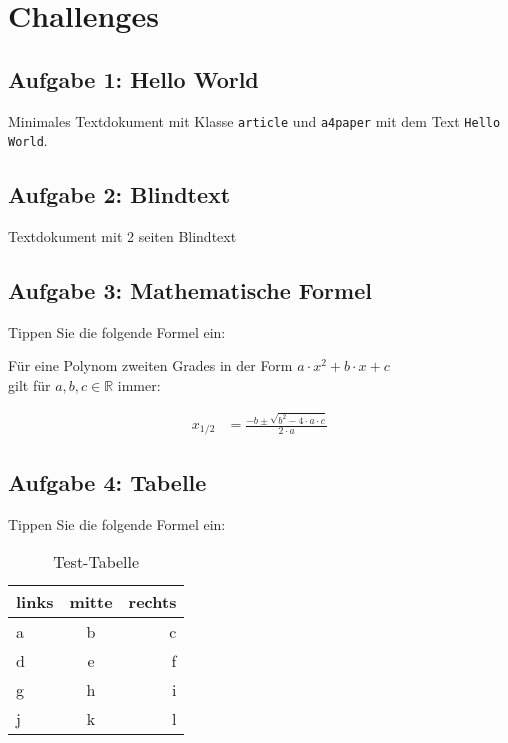 \documentclass[
    ngerman,
    accentcolor=3b,
    dark_mode,
    fontsize= 12pt,
    a4paper,
    aspectratio=169,
    colorback=true,
    fancy_row_colors,
    leqno,
    fleqn,
    boxarc=3pt,
    fleqn,
]{algoslides}
\begin{document}
    \section{Challenges}\label{4}\label{Challenges}
    \subsection{Aufgabe 1: Hello World}
    \begin{frame}[fragile]
        \slidehead{}
        Minimales Textdokument mit Klasse \texttt{article} und \texttt{a4paper} mit dem Text \verb+Hello World+.
    \end{frame}
    \subsection{Aufgabe 2: Blindtext}
    \begin{frame}[fragile]
        \slidehead{}
        Textdokument mit 2 seiten Blindtext
    \end{frame}
    \subsection{Aufgabe 3: Mathematische Formel}
    \begin{frame}[fragile]
        \slidehead{}
        Tippen Sie die folgende Formel ein:
        \begin{defBox}
            Für eine Polynom zweiten Grades in der Form $a\cdot x^2+b\cdot x + c$ \\gilt für $a,b,c \in \mathbb{R}$ immer:%

            \begin{align}
                x_{1/2} & =\frac{-b\pm\sqrt{b^{2}-4\cdot a \cdot c}}{2\cdot a}
            \end{align}

        \end{defBox}
    \end{frame}
    \subsection{Aufgabe 4: Tabelle}
    \begin{frame}[fragile]
        \slidehead{}
        Tippen Sie die folgende Formel ein:
        \begin{table}[ht]
            \centering
            \begin{tabular}{l|c|r}
                \textbf{links} & \textbf{mitte} & \textbf{rechts} \\
                \hline
                a              & b              & c               \\
                d              & e              & f               \\
                g              & h              & i               \\
                j              & k              & l
            \end{tabular}
            \caption{Test-Tabelle}
            \label{tab:Test}
        \end{table}
    \end{frame}
\end{document}
